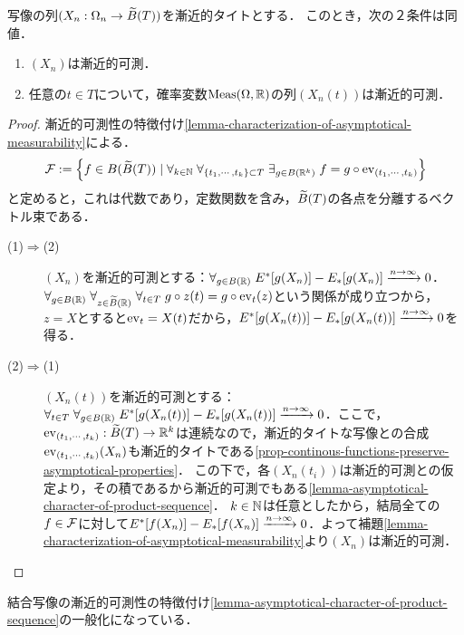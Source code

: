 \documentclass[uplatex,dvipdfmx]{jsreport}
\begin{document}
\begin{lemma}[見本過程への注目]\label{lemma-characterization-of-asymptotical-measurability-in-terms-of-finite-evaluation}
    写像の列$(X_n:\Omega_n\to\widetilde{B}(T))$を漸近的タイトとする．
    このとき，次の２条件は同値．
    \begin{enumerate}
        \item $(X_n)$は漸近的可測．
        \item 任意の$t\in T$について，確率変数$\mathrm{Meas}(\Omega,\mathbb{R})$の列$(X_n(t))$は漸近的可測．
    \end{enumerate}
\end{lemma}
\begin{proof}
    漸近的可測性の特徴付け\ref{lemma-characterization-of-asymptotical-measurability}による．
    \[\mathcal{F}:=\left\{f\in B(\widetilde{B}(T))\mid\forall_{k\in\mathbb{N}}\;\forall_{\{t_1,\cdots,t_k\}\subset T}\;\exists_{g\in B(\mathbb{R}^k)}\;f=g\circ\mathrm{ev}_{(t_1,\cdots,t_k)}\right\}\]
    と定めると，これは代数であり，定数関数を含み，$\widetilde{B}(T)$の各点を分離するベクトル束である．
    \begin{description}
        \item[(1)$\Rightarrow$(2)] $(X_n)$を漸近的可測とする：$\forall_{g\in B(\mathbb{R})}\;E^*[g(X_n)]-E_*[g(X_n)]\xrightarrow{n\to\infty} 0$．
        $\forall_{g\in B(\mathbb{R})}\;\forall_{z\in\widetilde{B}(\mathbb{R})}\;\forall_{t\in T}\;g\circ z(t)=g\circ\mathrm{ev}_t(z)$という関係が成り立つから，$z=X$とすると$\mathrm{ev}_t=X(t)$だから，$E^*[g(X_n(t))]-E_*[g(X_n(t))]\xrightarrow{n\to\infty} 0$を得る．
        \item[(2)$\Rightarrow$(1)] $(X_n(t))$を漸近的可測とする：$\forall_{t\in T}\;\forall_{g\in B(\mathbb{R})}\;E^*[g(X_n(t))]-E_*[g(X_n(t))]\xrightarrow{n\to\infty}0$．ここで，$\mathrm{ev}_{(t_1,\cdots,t_k)}:\widetilde{B}(T)\to\mathbb{R}^k$は連続なので，漸近的タイトな写像との合成$\mathrm{ev}_{(t_1,\cdots,t_k)}(X_n)$も漸近的タイトである\ref{prop-continous-functions-preserve-asymptotical-properties}．
        この下で，各$(X_n(t_i))$は漸近的可測との仮定より，その積であるから漸近的可測でもある\ref{lemma-asymptotical-character-of-product-sequence}．
        $k\in\mathbb{N}$は任意としたから，結局全ての$f\in\mathcal{F}$に対して$E^*[f(X_n)]-E_*[f(X_n)]\xrightarrow{n\to\infty}0$．よって補題\ref{lemma-characterization-of-asymptotical-measurability}より$(X_n)$は漸近的可測．
    \end{description}
\end{proof}
\begin{remarks}
    結合写像の漸近的可測性の特徴付け\ref{lemma-asymptotical-character-of-product-sequence}の一般化になっている．
\end{remarks}
\end{document}
